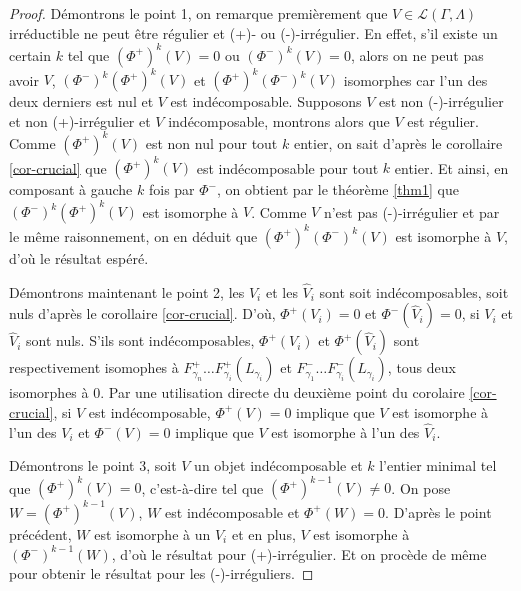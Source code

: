 \documentclass[a4paper,11pt]{article}
\begin{document}
\begin{proof}
  Démontrons le point 1, on remarque premièrement que $V\in \mathscr L(\Gamma,\Lambda)$ irréductible ne peut être régulier et (+)- ou (-)-irrégulier. En effet, s'il existe un certain  $k$ tel que $(\Phi^{+})^{k}(V) = 0$ ou $(\Phi^{-})^{k}(V) = 0$, alors on ne peut pas avoir $V$, $(\Phi^{-})^{k}(\Phi^{+})^{k}(V)$ et $(\Phi^{+})^{k}(\Phi^{-})^{k}(V)$ isomorphes car l'un des deux derniers est nul et $V$ est indécomposable. Supposons $V$ est non (-)-irrégulier et non (+)-irrégulier et $V$ indécomposable, montrons alors que $V$ est régulier. Comme $(\Phi^{+})^{k}(V)$ est non nul pour tout $k$ entier, on sait d'après le corollaire \ref{cor-crucial} que $(\Phi^{+})^{k}(V)$ est indécomposable pour tout $k$ entier. Et ainsi, en composant à gauche $k$ fois par $\Phi^{-}$, on obtient par le théorème \ref{thm1} que $(\Phi^{-})^{k}(\Phi^{+})^{k}(V)$ est isomorphe à $V$. Comme $V$ n'est pas (-)-irrégulier et par le même raisonnement, on en déduit que $(\Phi^{+})^{k}(\Phi^{-})^{k}(V)$ est isomorphe à $V$, d'où le résultat espéré.

  Démontrons maintenant le point 2, les $V_{i}$ et les $\widehat{V}_{i}$ sont soit indécomposables, soit nuls d'après le corollaire \ref{cor-crucial}. D'où, $\Phi^{+}(V_{i}) =0$ et $\Phi^{-}(\widehat{V}_{i})=0$, si $V_{i}$ et $\widehat{V}_{i}$ sont nuls. S'ils sont indécomposables, $\Phi^{+}(V_{i})$ et $\Phi^{+}(\widehat{V}_{i})$ sont respectivement isomophes à $F^{+}_{\gamma_{n}} \dots F^{+}_{\gamma_{i}}(L_{\gamma_{i}})$ et $F^{-}_{\gamma_{1}} \dots F^{-}_{\gamma_{i}}(L_{\gamma_{i}})$, tous deux isomorphes à 0. Par une utilisation directe du deuxième point du corolaire \ref{cor-crucial}, si $V$ est indécomposable, $\Phi^{+}(V) = 0$ implique que $V$ est isomorphe à l'un des $V_{i}$ et  $\Phi^{-}(V)=0$ implique que $V$ est isomorphe à l'un des $\widehat{V}_{i}$.

Démontrons le point 3, soit $V$ un objet indécomposable et $k$ l'entier minimal tel que $(\Phi^{+})^{k}(V) = 0$, c'est-à-dire tel que $(\Phi^{+})^{k-1}(V) \neq 0$. On pose $W = (\Phi^{+})^{k-1}(V)$, $W$ est indécomposable et $\Phi^{+}(W) = 0$. D'après le point précédent, $W$ est isomorphe à un $V_{i}$ et en plus, $V$ est isomorphe à $(\Phi^{-})^{k-1}(W)$, d'où le résultat pour (+)-irrégulier. Et on procède de même pour obtenir le résultat pour les (-)-irréguliers. 
\end{proof}
\clearpage
\end{document}
